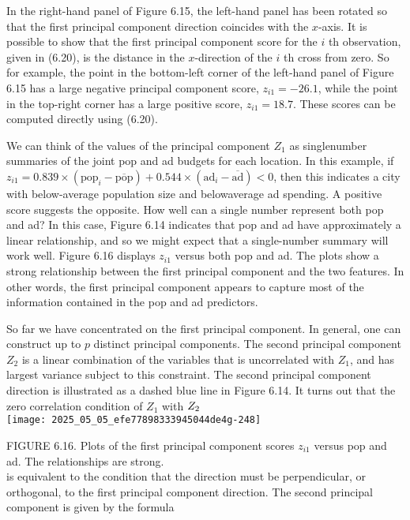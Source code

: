 \documentclass[10pt]{article}
\begin{document}
In the right-hand panel of Figure 6.15, the left-hand panel has been rotated so that the first principal component direction coincides with the $x$-axis. It is possible to show that the first principal component score for the $i$ th observation, given in (6.20), is the distance in the $x$-direction of the $i$ th cross from zero. So for example, the point in the bottom-left corner of the left-hand panel of Figure 6.15 has a large negative principal component score, $z_{i 1}=-26.1$, while the point in the top-right corner has a large positive score, $z_{i 1}=18.7$. These scores can be computed directly using (6.20).

We can think of the values of the principal component $Z_{1}$ as singlenumber summaries of the joint pop and ad budgets for each location. In this example, if $z_{i 1}=0.839 \times\left(\mathrm{pop}_{i}-\overline{\mathrm{pop}}\right)+0.544 \times\left(\mathrm{ad}_{i}-\overline{\mathrm{ad}}\right)<0$, then this indicates a city with below-average population size and belowaverage ad spending. A positive score suggests the opposite. How well can a single number represent both pop and ad? In this case, Figure 6.14 indicates that pop and ad have approximately a linear relationship, and so we might expect that a single-number summary will work well. Figure 6.16 displays $z_{i 1}$ versus both pop and ad. The plots show a strong relationship between the first principal component and the two features. In other words, the first principal component appears to capture most of the information contained in the pop and ad predictors.

So far we have concentrated on the first principal component. In general, one can construct up to $p$ distinct principal components. The second principal component $Z_{2}$ is a linear combination of the variables that is uncorrelated with $Z_{1}$, and has largest variance subject to this constraint. The second principal component direction is illustrated as a dashed blue line in Figure 6.14. It turns out that the zero correlation condition of $Z_{1}$ with $Z_{
2}$\\
\texttt{[image: 2025\_05\_05\_efe77898333945044de4g-248]}

FIGURE 6.16. Plots of the first principal component scores $z_{i 1}$ versus pop and ad. The relationships are strong.\\
is equivalent to the condition that the direction must be perpendicular, or orthogonal, to the first principal component direction. The second principal component is given by the formula
\end{document}
